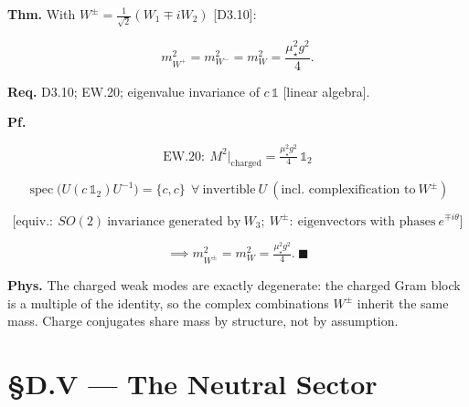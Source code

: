 \begin{theorem}\label{tag:EW-21}
\textbf{Thm.} With $W^\pm=\tfrac1{\sqrt2}(W_1\mp iW_2)$ [D3.10]:

\[
m_{W^+}^2=m_{W^-}^2=m_W^2=\frac{\mu_\star^2g^2}{4}.
\]

\textbf{Req.} D3.10; EW.20; eigenvalue invariance of $c\,\mathbb1$ [linear algebra].

\textbf{Pf.}

\[
\mathrm{EW.20}:\ M^2\big|_{\text{charged}}=\tfrac{\mu_\star^2g^2}{4}\,\mathbb1_2
\]

\[
\operatorname{spec}\bigl(U(c\,\mathbb1_2)U^{-1}\bigr)=\{c,c\}\ \ \forall\ \text{invertible}\ U\ (\text{incl. complexification to}\ W^\pm)
\]

\[
\bigl[\text{equiv.}:\ SO(2)\ \text{invariance generated by}\ W_3;\ W^\pm:\ \text{eigenvectors with phases}\ e^{\mp i\theta}\bigr]
\]

\[
\implies m_{W^\pm}^2=m_W^2=\tfrac{\mu_\star^2g^2}{4}.\ \blacksquare
\]

\textbf{Phys.} The charged weak modes are exactly degenerate: the charged Gram block is a multiple of the identity, so the complex combinations $W^\pm$ inherit the same mass. Charge conjugates share mass by structure, not by assumption.

\end{theorem}

\section[§D.V — The Neutral Sector]{\texorpdfstring{§D.V — The Neutral Sector}{SD.V - The Neutral Sector}}


